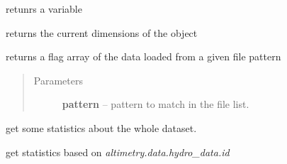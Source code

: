 \documentclass[letterpaper,10pt,english]{sphinxmanual}
\begin{document}
\begin{fulllineitems}

\begin{fulllineitems}
\label{altimetry.data:altimetry.data.hydro_data.get}
retunrs a variable

\end{fulllineitems}


\begin{fulllineitems}
\label{altimetry.data:altimetry.data.hydro_data.get_currentDim}
returns the current dimensions of the object

\end{fulllineitems}


\begin{fulllineitems}
\label{altimetry.data:altimetry.data.hydro_data.get_file}
returns a flag array of the data loaded from a given file pattern
\begin{quote}\begin{description}
\item[{Parameters}] \leavevmode
\textbf{pattern} -- pattern to match in the file list.

\end{description}\end{quote}

\end{fulllineitems}


\begin{fulllineitems}
\label{altimetry.data:altimetry.data.hydro_data.get_object_stats}
get some statistics about the whole dataset.

\end{fulllineitems}


\begin{fulllineitems}
\label{altimetry.data:altimetry.data.hydro_data.get_platform_stats}
get statistics based on \emph{altimetry.data.hydro\_data.id}


\end{fulllineitems}
\end{fulllineitems}
\end{document}
